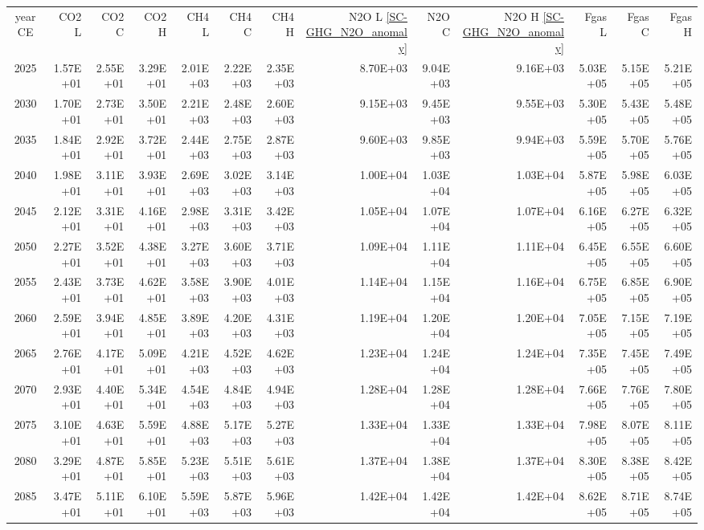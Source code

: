 \documentclass{article}
\begin{document}
\begin{table}
\begin{tabular}{crrr|rrr|rrr|rrr}
year CE  & CO2 L    & CO2 C    & CO2 H    & CH4 L    & CH4 C    & CH4 H    & N2O L \ref{SC-GHG_N2O_anomaly}     & N2O C      & N2O H \ref{SC-GHG_N2O_anomaly}    & Fgas L   & Fgas C   & Fgas H   \\
2025     & 1.57E+01 & 2.55E+01 & 3.29E+01 & 2.01E+03 & 2.22E+03 & 2.35E+03 & 8.70E+03 & 9.04E+03 & 9.16E+03 & 5.03E+05 & 5.15E+05 & 5.21E+05 \\
2030     & 1.70E+01 & 2.73E+01 & 3.50E+01 & 2.21E+03 & 2.48E+03 & 2.60E+03 & 9.15E+03 & 9.45E+03 & 9.55E+03 & 5.30E+05 & 5.43E+05 & 5.48E+05 \\
2035     & 1.84E+01 & 2.92E+01 & 3.72E+01 & 2.44E+03 & 2.75E+03 & 2.87E+03 & 9.60E+03 & 9.85E+03 & 9.94E+03 & 5.59E+05 & 5.70E+05 & 5.76E+05 \\
2040     & 1.98E+01 & 3.11E+01 & 3.93E+01 & 2.69E+03 & 3.02E+03 & 3.14E+03 & 1.00E+04 & 1.03E+04 & 1.03E+04 & 5.87E+05 & 5.98E+05 & 6.03E+05 \\
2045     & 2.12E+01 & 3.31E+01 & 4.16E+01 & 2.98E+03 & 3.31E+03 & 3.42E+03 & 1.05E+04 & 1.07E+04 & 1.07E+04 & 6.16E+05 & 6.27E+05 & 6.32E+05 \\
2050     & 2.27E+01 & 3.52E+01 & 4.38E+01 & 3.27E+03 & 3.60E+03 & 3.71E+03 & 1.09E+04 & 1.11E+04 & 1.11E+04 & 6.45E+05 & 6.55E+05 & 6.60E+05 \\
2055     & 2.43E+01 & 3.73E+01 & 4.62E+01 & 3.58E+03 & 3.90E+03 & 4.01E+03 & 1.14E+04 & 1.15E+04 & 1.16E+04 & 6.75E+05 & 6.85E+05 & 6.90E+05 \\
2060     & 2.59E+01 & 3.94E+01 & 4.85E+01 & 3.89E+03 & 4.20E+03 & 4.31E+03 & 1.19E+04 & 1.20E+04 & 1.20E+04 & 7.05E+05 & 7.15E+05 & 7.19E+05 \\
2065     & 2.76E+01 & 4.17E+01 & 5.09E+01 & 4.21E+03 & 4.52E+03 & 4.62E+03 & 1.23E+04 & 1.24E+04 & 1.24E+04 & 7.35E+05 & 7.45E+05 & 7.49E+05 \\
2070     & 2.93E+01 & 4.40E+01 & 5.34E+01 & 4.54E+03 & 4.84E+03 & 4.94E+03 & 1.28E+04 & 1.28E+04 & 1.28E+04 & 7.66E+05 & 7.76E+05 & 7.80E+05 \\
2075     & 3.10E+01 & 4.63E+01 & 5.59E+01 & 4.88E+03 & 5.17E+03 & 5.27E+03 & 1.33E+04 & 1.33E+04 & 1.33E+04 & 7.98E+05 & 8.07E+05 & 8.11E+05 \\
2080     & 3.29E+01 & 4.87E+01 & 5.85E+01 & 5.23E+03 & 5.51E+03 & 5.61E+03 & 1.37E+04 & 1.38E+04 & 1.37E+04 & 8.30E+05 & 8.38E+05 & 8.42E+05 \\
2085     & 3.47E+01 & 5.11E+01 & 6.10E+01 & 5.59E+03 & 5.87E+03 & 5.96E+03 & 1.42E+04 & 1.42E+04 & 1.42E+04 & 8.62E+05 & 8.71E+05 & 8.74E+05 \\

\end{tabular}
\end{table}
\end{document}
